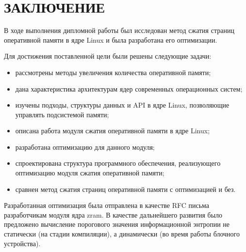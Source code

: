 \section*{ЗАКЛЮЧЕНИЕ}

В ходе выполнения дипломной работы был исследован метод сжатия страниц оперативной памяти в ядре Linux и была разработана его оптимизации.

Для достижения поставлен­ной цели были решены следующие задачи:

\begin{itemize}
	\item рассмотрены методы увеличения количества оперативной памяти;
	\item дана характеристика архитектурам ядер современных операционных систем;
	\item изучены подходы, структуры данных и API \cite{api} в ядре Linux, позволяющие управлять подсистемой памяти;
	\item описана работа модуля сжатия оперативной памяти в ядре Linux;
	\item разработана оптимизацию для данного модуля;
	\item спроектирована структура программного обеспечения, реализующего оптимизацию модуля сжатия оперативной памяти;
	\item сравнен метод сжатия страниц оперативной памяти с оптимизацией и без.
\end{itemize}

Разработанная оптимизация была отправлена в качестве RFC письма разработчикам модуля ядра zram. В качестве дальнейшего развития было предложено вычисление порогового значения информационной энтропии не статически (на стадии компиляции), а динамически (во время работы блочного устройства).

\pagebreak